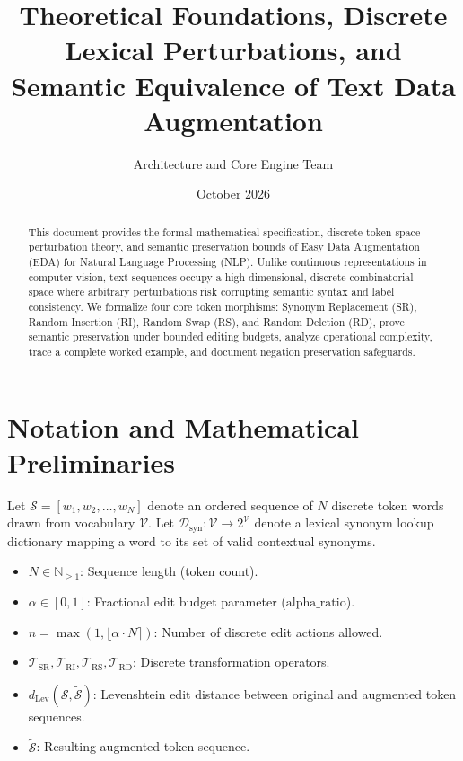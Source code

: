 \documentclass[11pt,a4paper]{article}
\title{\textbf{Theoretical Foundations, Discrete Lexical Perturbations, and Semantic Equivalence of Text Data Augmentation}}
\author{Architecture and Core Engine Team}
\date{October 2026}
\theoremstyle{definition}
\begin{document}
\maketitle

\begin{abstract}
This document provides the formal mathematical specification, discrete token-space perturbation theory, and semantic preservation bounds of Easy Data Augmentation (EDA) for Natural Language Processing (NLP). Unlike continuous representations in computer vision, text sequences occupy a high-dimensional, discrete combinatorial space where arbitrary perturbations risk corrupting semantic syntax and label consistency. We formalize four core token morphisms: Synonym Replacement (SR), Random Insertion (RI), Random Swap (RS), and Random Deletion (RD), prove semantic preservation under bounded editing budgets, analyze operational complexity, trace a complete worked example, and document negation preservation safeguards.
\end{abstract}

\section{Notation and Mathematical Preliminaries}

Let $\mathcal{S} = [w_1, w_2, \dots, w_N]$ denote an ordered sequence of $N$ discrete token words drawn from vocabulary $\mathcal{V}$. Let $\mathcal{D}_{\text{syn}}: \mathcal{V} \to 2^{\mathcal{V}}$ denote a lexical synonym lookup dictionary mapping a word to its set of valid contextual synonyms.

\begin{itemize}
    \item $N \in \mathbb{N}_{\ge 1}$: Sequence length (token count).
    \item $\alpha \in [0, 1]$: Fractional edit budget parameter ($\text{alpha\_ratio}$).
    \item $n = \max(1, \lfloor \alpha \cdot N \rceil)$: Number of discrete edit actions allowed.
    \item $\mathcal{T}_{\text{SR}}, \mathcal{T}_{\text{RI}}, \mathcal{T}_{\text{RS}}, \mathcal{T}_{\text{RD}}$: Discrete transformation operators.
    \item $d_{\text{Lev}}(\mathcal{S}, \tilde{\mathcal{S}})$: Levenshtein edit distance between original and augmented token sequences.
    \item $\tilde{\mathcal{S}}$: Resulting augmented token sequence.
\end{itemize}
\end{document}
